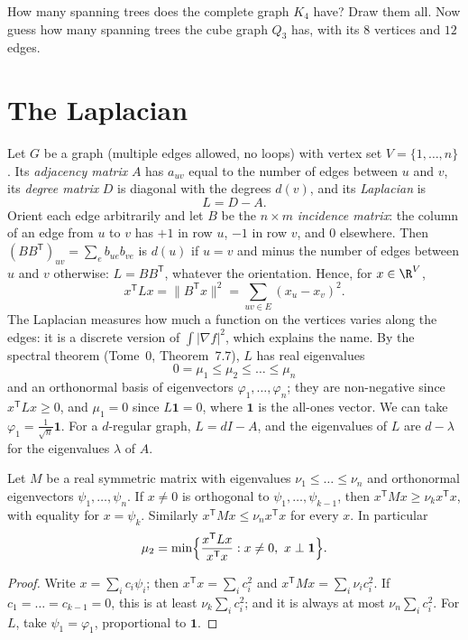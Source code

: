 \begin{think}
How many spanning trees does the complete graph $K_4$ have? Draw them all. Now guess how many spanning trees the cube graph
$Q_3$ has, with its $8$ vertices and $12$ edges.
\end{think}

\section{The Laplacian}

Let $G$ be a graph (multiple edges allowed, no loops) with vertex set $V=\{1,\dots,n\}$. Its \emph{adjacency matrix} $A$ has $a_{uv}$ equal to the
number of edges between $u$ and $v$, its \emph{degree matrix} $D$ is diagonal with the degrees $d(v)$, and its \emph{Laplacian} is
\[
L=D-A.
\]
Orient each edge arbitrarily and let $B$ be the $n\times m$ \emph{incidence matrix}: the column of an edge from $u$ to $v$ has $+1$ in row $u$, $-1$ in
row $v$, and $0$ elsewhere. Then $(BB^{\mathsf T})_{uv}=\sum_eb_{ue}b_{ve}$ is $d(u)$ if $u=v$ and minus the number of edges between $u$ and $v$ otherwise:
$L=BB^{\mathsf T}$, whatever the orientation. Hence, for $x\in\R^V$,
\[
x^{\mathsf T}Lx=\|B^{\mathsf T}x\|^2=\sum_{uv\in E}(x_u-x_v)^2.
\]
The Laplacian measures how much a function on the vertices varies along the edges: it is a discrete version of $\int|\nabla f|^2$, which
explains the name. By the spectral theorem (Tome~0, Theorem~7.7), $L$ has real eigenvalues
\[
0=\mu_1\le\mu_2\le\dots\le\mu_n
\]
and an orthonormal basis of eigenvectors $\varphi_1,\dots,\varphi_n$; they are non-negative since $x^{\mathsf T}Lx\ge0$, and $\mu_1=0$ since $L\mathbf1=0$, where $\mathbf1$ is the all-ones
vector. We can take $\varphi_1=\frac1{\sqrt n}\mathbf1$. For a $d$-regular graph, $L=dI-A$, and the eigenvalues of $L$ are $d-\lambda$ for the eigenvalues $\lambda$ of $A$.

\begin{lemma}[Rayleigh]\label{lem:rayleigh}
Let $M$ be a real symmetric matrix with eigenvalues $\nu_1\le\dots\le\nu_n$ and orthonormal eigenvectors $\psi_1,\dots,\psi_n$. If $x\ne0$ is orthogonal to
$\psi_1,\dots,\psi_{k-1}$, then $x^{\mathsf T}Mx\ge\nu_kx^{\mathsf T}x$, with equality for $x=\psi_k$. Similarly $x^{\mathsf T}Mx\le\nu_nx^{\mathsf T}x$ for every $x$. In particular
\[
\mu_2=\min\Bigl\{\frac{x^{\mathsf T}Lx}{x^{\mathsf T}x}:x\ne0,\ x\perp\mathbf1\Bigr\}.
\]
\end{lemma}
\begin{proof}
Write $x=\sum_ic_i\psi_i$; then $x^{\mathsf T}x=\sum_ic_i^2$ and $x^{\mathsf T}Mx=\sum_i\nu_ic_i^2$. If $c_1=\dots=c_{k-1}=0$, this is at least $\nu_k\sum_ic_i^2$; and it is always at most
$\nu_n\sum_ic_i^2$. For $L$, take $\psi_1=\varphi_1$, proportional to $\mathbf1$.
\end{proof}

